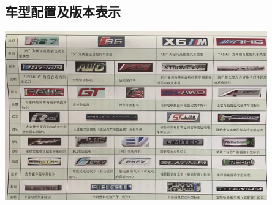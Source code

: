 \subsection{车型配置及版本表示}
	\begin{center}
		\includegraphics[width=0.85\textwidth]{6-5}
	\end{center}

